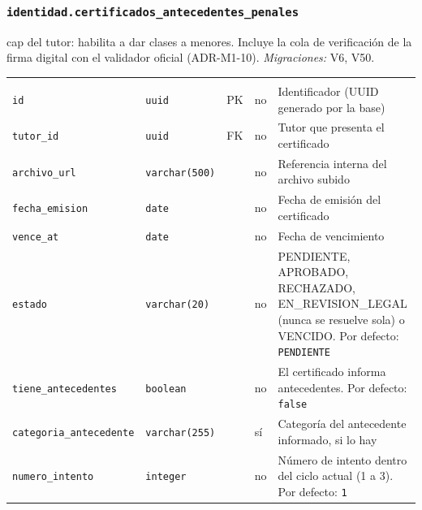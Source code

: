 \subsubsection{\texorpdfstring{\texttt{identidad.certificados\_\allowbreak{}antecedentes\_\allowbreak{}penales}}{identidad.certificados\_antecedentes\_penales}}\label{dd:identidad.certificados_antecedentes_penales}

\gls{cap} del tutor: habilita a dar clases a menores. Incluye la cola de verificación de la firma digital con el validador oficial (ADR-M1-10). \emph{Migraciones:} V6, V50.

{\small
\begin{xltabular}{\textwidth}{@{}>{\raggedright\arraybackslash}p{3.6cm} >{\raggedright\arraybackslash}p{2.3cm} >{\raggedright\arraybackslash}p{1cm} >{\centering\arraybackslash}p{0.85cm} L@{}}
    \toprule
     &  &  &  &  \\
    \midrule
    \endfirsthead
    \toprule
     &  &  &  &  \\
    \midrule
    \endhead
    \bottomrule
    \endfoot
    \texttt{id} & \texttt{uuid} & PK & no & Identificador (UUID generado por la base) \\
    \texttt{tutor\_\allowbreak{}id} & \texttt{uuid} & FK & no & Tutor que presenta el certificado \\
    \texttt{archivo\_\allowbreak{}url} & \texttt{varchar(\allowbreak{}500)} &  & no & Referencia interna del archivo subido \\
    \texttt{fecha\_\allowbreak{}emision} & \texttt{date} &  & no & Fecha de emisión del certificado \\
    \texttt{vence\_\allowbreak{}at} & \texttt{date} &  & no & Fecha de vencimiento \\
    \texttt{estado} & \texttt{varchar(\allowbreak{}20)} &  & no & PENDIENTE, APROBADO, RECHAZADO, EN\_REVISION\_LEGAL (nunca se resuelve sola) o VENCIDO. Por defecto: \texttt{\textquotesingle{}PENDIENTE\textquotesingle{}} \\
    \texttt{tiene\_\allowbreak{}antecedentes} & \texttt{boolean} &  & no & El certificado informa antecedentes. Por defecto: \texttt{false} \\
    \texttt{categoria\_\allowbreak{}antecedente} & \texttt{varchar(\allowbreak{}255)} &  & sí & Categoría del antecedente informado, si lo hay \\
    \texttt{numero\_\allowbreak{}intento} & \texttt{integer} &  & no & Número de intento dentro del ciclo actual (1 a 3). Por defecto: \texttt{1} \\

\end{xltabular}}
